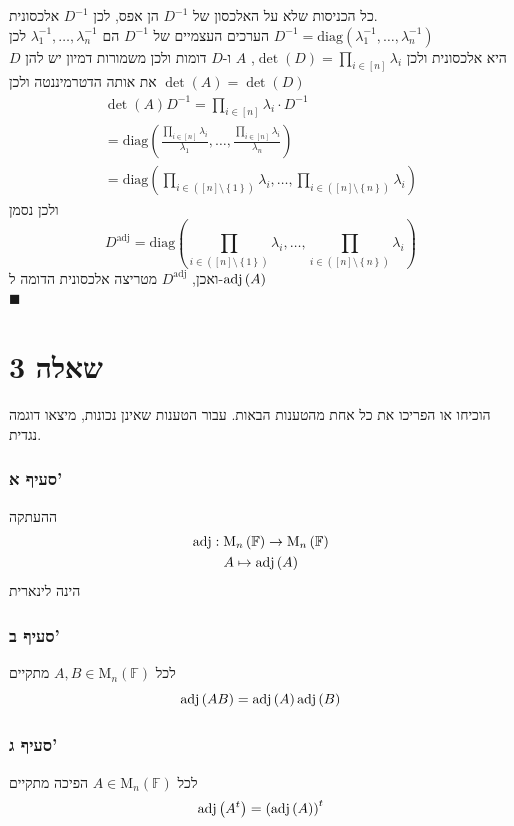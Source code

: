\documentclass[12pt, titlepage]{article}
\begin{document}
כל הכניסות שלא על האלכסון של $D^{-1}$ הן אפס, לכן $D^{-1}$ אלכסונית.\\
הערכים העצמיים של $D^{-1}$ הם $\lambda_1^{-1},\ldots,\lambda_n^{-1}$ לכן $D^{-1}=\mathrm{diag}\left(\lambda_1^{-1},\ldots,\lambda_n^{-1}\right)$\\
$D$ היא אלכסונית ולכן $\det\left(D\right)  = \prod_{i\in\left[n\right]}\lambda_i$, $A$ ו-$D$ דומות ולכן משמורות דמיון יש להן את אותה הדטרמיננטה ולכן $\det\left(A\right)=\det\left(D\right)$
\begin{gather*}
    \det\left(A\right) D^{-1} = \prod_{i\in\left[n\right]}\lambda_i \cdot D^{-1} \\
    = \mathrm{diag}\left(\frac{\prod_{i\in\left[n\right]}\lambda_i}{\lambda_1},\ldots,\frac{\prod_{i\in\left[n\right]}\lambda_i}{\lambda_n}\right)\\
    =  \mathrm{diag}\left(\prod_{i\in\left(\left[n\right]\setminus\left\{1\right\}\right)}\lambda_i,\ldots,\prod_{i\in\left(\left[n\right]\setminus\left\{n\right\}\right)}\lambda_i\right)
\end{gather*}
ולכן נסמן
\[
    D^{\mathrm{adj}} =   \mathrm{diag}\left(\prod_{i\in\left(\left[n\right]\setminus\left\{1\right\}\right)}\lambda_i,\ldots,\prod_{i\in\left(\left[n\right]\setminus\left\{n\right\}\right)}\lambda_i\right)
\]
ואכן, $D^{\mathrm{adj}}$ מטריצה אלכסונית הדומה ל-$\mathrm{adj}\left(A\right)$\\
$\blacksquare$
\newpage
\part*{שאלה 3}
הוכיחו או הפריכו את כל אחת מהטענות הבאות. עבור הטענות שאינן נכונות, מיצאו דוגמה נגדית.
\section*{סעיף א'}
ההעתקה
\begin{gather*}
    \mathrm{adj}: \mathrm{M}_n\left(\mathbb{F}\right) \to \mathrm{M}_n\left(\mathbb{F}\right)\\
    A\mapsto \mathrm{adj}\left(A\right)
\end{gather*}
הינה לינארית
\section*{סעיף ב'}
לכל $A,B\in \mathrm{M}_n\left(\mathbb{F}\right)$ מתקיים
\[
    \mathrm{adj}\left(AB\right) = \mathrm{adj}\left(A\right)\mathrm{adj}\left(B\right)
\]
\section*{סעיף ג'}
לכל $A\in \mathrm{M}_n\left(\mathbb{F}\right)$ הפיכה מתקיים
\[
    \mathrm{adj}\left(A^t\right)  = \left(\mathrm{adj}\left(A\right)\right)^t
\]
\end{document}
